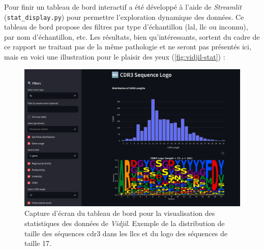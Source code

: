 \vspace{1em}

Pour finir un tableau de bord interactif a été développé à l'aide de
\textit{Streamlit} (\texttt{stat\_display.py}) pour permettre l'exploration
dynamique des données. Ce tableau de bord propose des filtres par type
d'échantillon (\gls{lal}, \gls{llc} ou inconnu), par nom d'échantillon, etc.
Les résultats, bien qu'intéressants, sortent du cadre de ce rapport ne traitant
pas de la même pathologie et ne seront pas présentés ici, mais en voici une
illustration pour le plaisir des yeux (\autoref{fig:vidjil-stat}) :

\begin{figure}[H]
    \centering
    \includegraphics[width=1\textwidth]{images/vidjil_stat.png}
    \caption{
        Capture d'écran du tableau de bord pour la visualisation des statistiques des données de \textit{Vidjil}.
        Exemple de la distribution de taille des séquences \gls{cdr}3 dans les \glspl{llc} et du logo des séquences
        de taille 17.
    }
    \label{fig:vidjil-stat}
\end{figure}